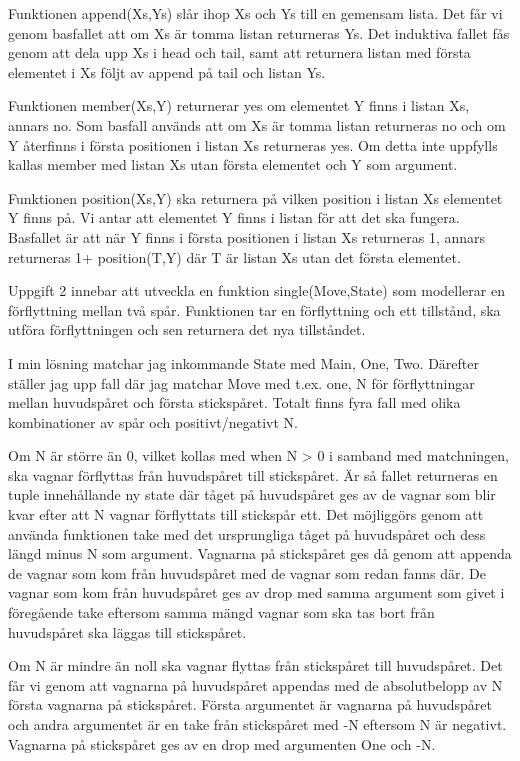 \documentclass[a4paper, 11pt]{article}
\begin{document}
Funktionen append(Xs,Ys) slår ihop Xs och Ys till en gemensam lista. Det får vi genom basfallet att om Xs är tomma listan returneras Ys. Det induktiva fallet fås genom att dela upp Xs i head och tail, samt att returnera listan med första elementet i Xs följt av append på tail och listan Ys.

Funktionen member(Xs,Y) returnerar yes om elementet Y finns i listan Xs, annars no. Som basfall används att om Xs är tomma listan returneras no och om Y återfinns i första positionen i listan Xs returneras yes. Om detta inte uppfylls kallas member med listan Xs utan första elementet och Y som argument.

Funktionen position(Xs,Y) ska returnera på vilken position i listan Xs elementet Y finns på. Vi antar att elementet Y finns i listan för att det ska fungera. Basfallet är att när Y finns i första positionen i listan Xs returneras 1, annars returneras 1+ position(T,Y) där T är listan Xs utan det första elementet.

Uppgift 2 innebar att utveckla en funktion single(Move,State) som modellerar en förflyttning mellan två spår. Funktionen tar en förflyttning och ett tillstånd, ska utföra förflyttningen och sen returnera det nya tillståndet.

I min lösning matchar jag inkommande State med {Main, One, Two}. Därefter ställer jag upp fall där jag matchar Move med t.ex. {one, N} för förflyttningar mellan huvudspåret och första stickspåret. Totalt finns fyra fall med olika kombinationer av spår och positivt/negativt N. 

Om N är större än 0, vilket kollas med when N > 0 i samband med matchningen, ska vagnar förflyttas från huvudspåret till stickspåret. Är så fallet returneras en tuple innehållande ny state där tåget på huvudspåret ges av de vagnar som blir kvar efter att N vagnar förflyttats till stickspår ett. Det möjliggörs genom att använda funktionen take med det ursprungliga tåget på huvudspåret och dess längd minus N som argument. Vagnarna på stickspåret ges då genom att appenda de vagnar som kom från huvudspåret med de vagnar som redan fanns där. De vagnar som kom från huvudspåret ges av drop med samma argument som givet i föregående take eftersom samma mängd vagnar som ska tas bort från huvudspåret ska läggas till stickspåret. 

Om N är mindre än noll ska vagnar flyttas från stickspåret till huvudspåret. Det får vi genom att vagnarna på huvudspåret appendas med de absolutbelopp av N första vagnarna på stickspåret. Första argumentet är vagnarna på huvudspåret och andra argumentet är en take från stickspåret med -N eftersom N är negativt. Vagnarna på stickspåret ges av en drop med argumenten One och -N.
\end{document}
